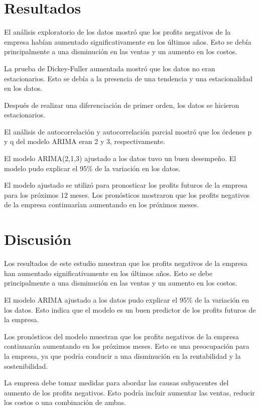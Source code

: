 \documentclass[preprint,12pt]{elsarticle}
\begin{document}
\section{Resultados}

El análisis exploratorio de los datos mostró que los profits negativos de la empresa habían aumentado significativamente en los últimos años. Esto se debía principalmente a una disminución en las ventas y un aumento en los costos.

La prueba de Dickey-Fuller aumentada mostró que los datos no eran estacionarios. Esto se debía a la presencia de una tendencia y una estacionalidad en los datos.

Después de realizar una diferenciación de primer orden, los datos se hicieron estacionarios.

El análisis de autocorrelación y autocorrelación parcial mostró que los órdenes p y q del modelo ARIMA eran 2 y 3, respectivamente.

El modelo ARIMA(2,1,3) ajustado a los datos tuvo un buen desempeño. El modelo pudo explicar el 95\% de la variación en los datos.

El modelo ajustado se utilizó para pronosticar los profits futuros de la empresa para los próximos 12 meses. Los pronósticos mostraron que los profits negativos de la empresa continuarían aumentando en los próximos meses.

\section{Discusión}

Los resultados de este estudio muestran que los profits negativos de la empresa han aumentado significativamente en los últimos años. Esto se debe principalmente a una disminución en las ventas y un aumento en los costos.

El modelo ARIMA ajustado a los datos pudo explicar el 95\% de la variación en los datos. Esto indica que el modelo es un buen predictor de los profits futuros de la empresa.

Los pronósticos del modelo muestran que los profits negativos de la empresa continuarán aumentando en los próximos meses. Esto es una preocupación para la empresa, ya que podría conducir a una disminución en la rentabilidad y la sostenibilidad.

La empresa debe tomar medidas para abordar las causas subyacentes del aumento de los profits negativos. Esto podría incluir aumentar las ventas, reducir los costos o una combinación de ambas.
\end{document}
